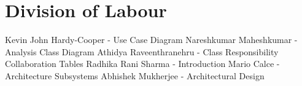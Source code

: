 \documentclass[]{article}
\begin{document}

\section{Division of Labour}
Kevin John Hardy-Cooper - Use Case Diagram 
\newline Nareshkumar Maheshkumar - Analysis Class Diagram
\newline Athidya Raveenthranehru - Class Responsibility Collaboration Tables
\newline Radhika Rani Sharma - Introduction
\newline Mario Calce - Architecture Subsystems
\newline Abhishek Mukherjee - Architectural Design 

\end{document}
